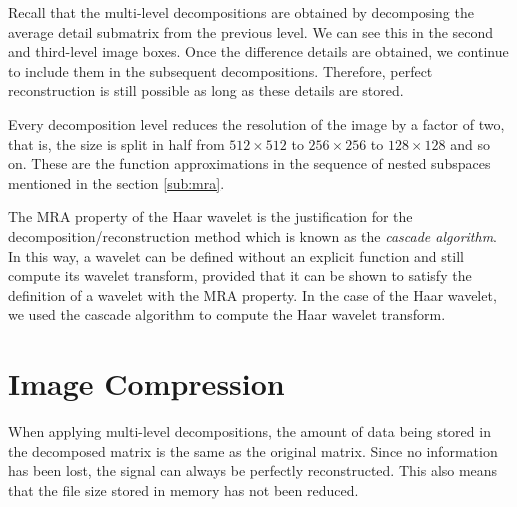\documentclass[12pt]{article}
\theoremstyle{definition}
\begin{document}
  Recall that the multi-level decompositions are obtained by decomposing the average detail submatrix from the previous level. We can see this in the second and third-level image boxes. Once the difference details are obtained, we continue to include them in the subsequent decompositions. Therefore, perfect reconstruction is still possible as long as these details are stored.

  Every decomposition level reduces the resolution of the image by a factor of two, that is, the size is split in half from \(512 \times 512\) to \(256 \times 256\) to \(128 \times 128\) and so on. These are the function approximations in the sequence of nested subspaces mentioned in the section \ref{sub:mra}.
  
  The MRA property of the Haar wavelet is the justification for the decomposition/reconstruction method which is known as the \textit{cascade algorithm}. In this way, a wavelet can be defined without an explicit function and still compute its wavelet transform, provided that it can be shown to satisfy the definition of a wavelet with the MRA property. In the case of the Haar wavelet, we used the cascade algorithm to compute the Haar wavelet transform.

  \section{Image Compression}

  When applying multi-level decompositions, the amount of data being stored in the decomposed matrix is the same as the original matrix. Since no information has been lost, the signal can always be perfectly reconstructed. This also means that the file size stored in memory has not been reduced.
  
\end{document}
